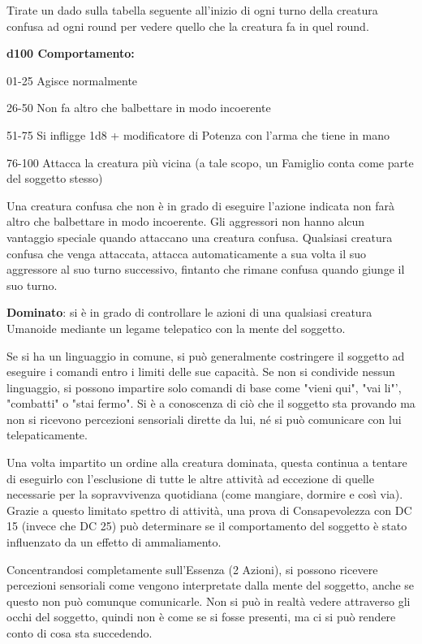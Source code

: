 \documentclass[a4paper,11pt,twoside,openany]{book}
\begin{document}
Tirate un dado sulla tabella seguente all'inizio di ogni turno della
creatura confusa ad ogni round per vedere quello che la creatura fa
in quel round.

\textbf{d100 Comportamento:}

01-25 Agisce normalmente

26-50 Non fa altro che balbettare in modo incoerente

51-75 Si infligge 1d8 + modificatore di Potenza con l'arma che tiene in mano

76-100 Attacca la creatura più vicina (a tale scopo, un Famiglio conta come parte del soggetto stesso)

Una creatura confusa che non è in grado di eseguire l'azione indicata non farà altro che balbettare in modo incoerente. Gli aggressori non hanno alcun vantaggio speciale quando attaccano una creatura confusa. Qualsiasi creatura confusa che venga attaccata, attacca automaticamente a sua volta il suo aggressore al suo turno successivo, fintanto che rimane confusa quando giunge il suo turno.

\textbf{Dominato}: si è in grado di controllare le azioni di una qualsiasi creatura Umanoide mediante un legame telepatico con la mente del soggetto.

Se si ha un linguaggio in comune, si può generalmente costringere il soggetto ad eseguire i comandi entro i limiti delle sue capacità. Se non si condivide nessun linguaggio, si possono impartire solo comandi di base come "vieni qui", "vai li"', "combatti" o "stai fermo". Si è a conoscenza di ciò che il soggetto sta provando ma non si ricevono percezioni sensoriali dirette da lui, né si può comunicare con lui telepaticamente.

Una volta impartito un ordine alla creatura dominata, questa continua a tentare di eseguirlo con l'esclusione di tutte le altre attività ad eccezione di quelle necessarie per la sopravvivenza quotidiana (come mangiare, dormire e così via). Grazie a questo limitato spettro di attività, una prova di Consapevolezza con DC 15 (invece che DC 25) può determinare se il comportamento del soggetto è stato influenzato da un effetto di ammaliamento.

Concentrandosi completamente sull'Essenza (2 Azioni), si possono ricevere percezioni sensoriali come vengono interpretate dalla mente del soggetto, anche se questo non può comunque comunicarle. Non si può in realtà vedere attraverso gli occhi del soggetto, quindi non è come se si fosse presenti, ma ci si può rendere conto di cosa sta succedendo.
\end{document}
